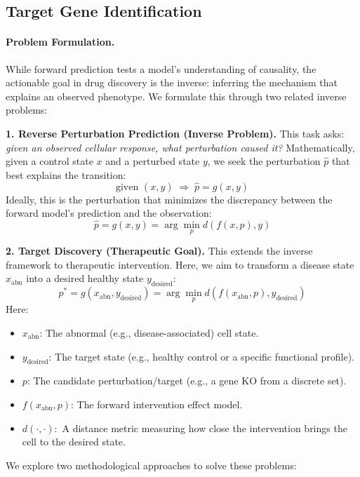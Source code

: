 \documentclass[conference]{IEEEtran}
\begin{document}
\subsection{Target Gene Identification}\label{sec:target_id_methods}

\paragraph{Problem Formulation.}
While forward prediction tests a model's understanding of causality, the actionable goal in drug discovery is the inverse: inferring the mechanism that explains an observed phenotype. We formulate this through two related inverse problems:

\textbf{1. Reverse Perturbation Prediction (Inverse Problem).}
This task asks: \textit{given an observed cellular response, what perturbation caused it?}
Mathematically, given a control state $x$ and a perturbed state $y$, we seek the perturbation $\hat{p}$ that best explains the transition:
\[
\text{given } (x, y) \;\Rightarrow\; \hat p = g(x, y)
\]
Ideally, this is the perturbation that minimizes the discrepancy between the forward model's prediction and the observation:
\[
\hat p = g(x, y) = \arg\min_{p} d\!\left(f(x, p), y\right)
\]

\textbf{2. Target Discovery (Therapeutic Goal).}
This extends the inverse framework to therapeutic intervention. Here, we aim to transform a disease state $x_{\text{abn}}$ into a desired healthy state $y_{\text{desired}}$:
\[
p^{*} = g(x_{\text{abn}}, y_{\text{desired}}) = \arg\min_{p} d\!\left(f(x_{\text{abn}}, p), y_{\text{desired}}\right)
\]
Here:
\begin{itemize}
    \item $x_{\text{abn}}$: The abnormal (e.g., disease-associated) cell state.
    \item $y_{\text{desired}}$: The target state (e.g., healthy control or a specific functional profile).
    \item $p$: The candidate perturbation/target (e.g., a gene KO from a discrete set).
    \item $f(x_{\text{abn}}, p)$: The forward intervention effect model.
    \item $d(\cdot,\cdot)$:\ A distance metric measuring how close the intervention brings the cell to the desired state.
\end{itemize}

We explore two methodological approaches to solve these problems:
\end{document}
